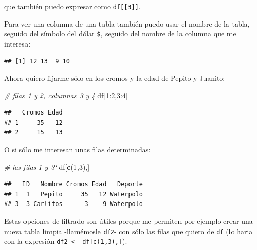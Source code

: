 \documentclass[]{book}
\newenvironment{Shaded}{\begin{snugshade}}{\end{snugshade}}
\newcommand{\KeywordTok}[1]{\textcolor[rgb]{0.13,0.29,0.53}{\textbf{{#1}}}}
\newcommand{\DecValTok}[1]{\textcolor[rgb]{0.00,0.00,0.81}{{#1}}}
\newcommand{\CommentTok}[1]{\textcolor[rgb]{0.56,0.35,0.01}{\textit{{#1}}}}
\newcommand{\NormalTok}[1]{{#1}}
\theoremstyle{definition}
\theoremstyle{definition}
\theoremstyle{remark}
\begin{document}
que también puedo expresar como \texttt{df{[}{[}3{]}{]}}.

Para ver una columna de una tabla también puedo usar el nombre de la
tabla, seguido del símbolo del dólar \texttt{\$}, seguido del nombre de
la columna que me interesa:

\begin{Shaded}
\end{Shaded}

\begin{verbatim}
## [1] 12 13  9 10
\end{verbatim}

Ahora quiero fijarme sólo en los cromos y la edad de Pepito y Juanito:

\begin{Shaded}
\begin{Highlighting}[]
\CommentTok{# filas 1 y 2, columnas 3 y 4}
\NormalTok{df[}\DecValTok{1}\NormalTok{:}\DecValTok{2}\NormalTok{,}\DecValTok{3}\NormalTok{:}\DecValTok{4}\NormalTok{] }
\end{Highlighting}
\end{Shaded}

\begin{verbatim}
##   Cromos Edad
## 1     35   12
## 2     15   13
\end{verbatim}

O si sólo me interesan unas filas determinadas:

\begin{Shaded}
\begin{Highlighting}[]
\CommentTok{# las filas 1 y 3`}
\NormalTok{df[}\KeywordTok{c}\NormalTok{(}\DecValTok{1}\NormalTok{,}\DecValTok{3}\NormalTok{),] }
\end{Highlighting}
\end{Shaded}

\begin{verbatim}
##   ID   Nombre Cromos Edad   Deporte
## 1  1   Pepito     35   12 Waterpolo
## 3  3 Carlitos      3    9 Waterpolo
\end{verbatim}

Estas opciones de filtrado son útiles porque me permiten por ejemplo
crear una nueva tabla limpia -llamémosle \texttt{df2}- con sólo las
filas que quiero de \texttt{df} (lo haria con la expresión
\texttt{df2\ \textless{}-\ df{[}c(1,3),{]}}).
\end{document}
